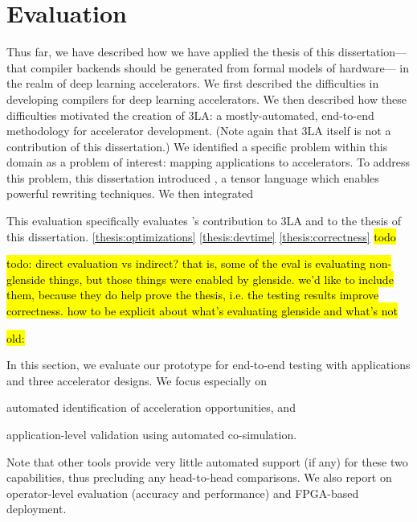 \chapter{Evaluation}
\label{sec:part1-evaluation}

Thus far, we have described
  how we have applied
  the thesis of this dissertation---%
  that compiler backends
  should be generated
  from formal models of hardware---%
  in the realm of deep learning accelerators.
We first described the difficulties
  in developing compilers
  for deep learning accelerators.
We then described how these difficulties
  motivated the creation of
  3LA: a mostly-automated, end-to-end
  methodology
  for accelerator development.
(Note again that 3LA itself
  is not a contribution of this dissertation.)
We identified a specific problem
  within this domain
  as a problem of interest:
  mapping applications to accelerators.
To address this problem,
  this dissertation
  introduced
  \g,
  a tensor language
  which enables powerful rewriting techniques.
We then integrated \g 
  

This evaluation specifically evaluates
  \g's contribution
  to 3LA
  and to the thesis of this dissertation.
\cref{thesis:optimizations}
\cref{thesis:devtime}
\cref{thesis:correctness}
\hl{todo}

\hl{todo: direct evaluation vs indirect? that is, some of the eval is evaluating non-glenside things, but those things were enabled by glenside. we'd like to include them, because they do help prove the thesis, i.e. the testing results improve correctness. how to be explicit about what's evaluating glenside and what's not}
  

\hl{old:}

In this section, 
  we evaluate our prototype 
  for end-to-end testing with \AppNum applications and three accelerator designs. We focus especially on
\begin{inlinelist}
\item automated identification of acceleration opportunities, and 
\item application-level validation using automated co-simulation.   
\end{inlinelist}
%
Note that other tools provide very little automated support (if any)
for these two capabilities, thus precluding any head-to-head comparisons. 
We also report on operator-level evaluation (accuracy and performance) and FPGA-based deployment.



